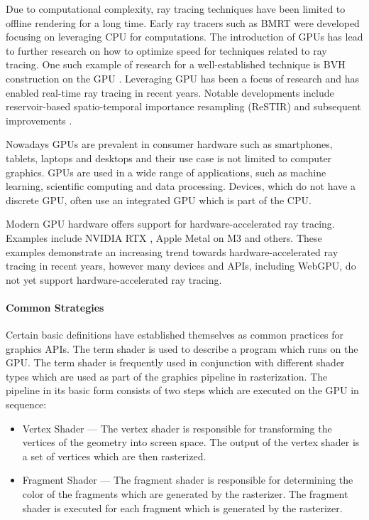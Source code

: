 Due to computational complexity, ray tracing techniques have been limited to offline rendering for a long time. Early ray tracers such as \gls{BMRT} were developed focusing on leveraging \gls{CPU} for computations. The introduction of \glspl{GPU} has lead to further research on how to optimize speed for techniques related to ray tracing. One such example of research for a well-established technique is \gls{BVH} construction on the \gls{GPU} \cite{lauterbach2009GPUbvh}. Leveraging \gls{GPU} has been a focus of research and has enabled real-time ray tracing in recent years. Notable developments include reservoir-based spatio-temporal importance resampling (ReSTIR) \cite{restir} and subsequent improvements \cite{restirAdvancements,restirGeneralized}.

Nowadays \glspl{GPU} are prevalent in consumer hardware such as smartphones, tablets, laptops and desktops and their use case is not limited to computer graphics. \glspl{GPU} are used in a wide range of applications, such as machine learning, scientific computing and data processing. Devices, which do not have a discrete \gls{GPU}, often use an integrated \gls{GPU} which is part of the \gls{CPU}.

Modern \gls{GPU} hardware offers support for hardware-accelerated ray tracing. Examples include NVIDIA RTX \cite{nvidiaRtxRayTracing}, Apple Metal on M3 \cite{appleM3GpuAdvancements} and others. These examples demonstrate an increasing trend towards hardware-accelerated ray tracing in recent years, however many devices and \glspl{API}, including \gls{WebGPU}, do not yet support hardware-accelerated ray tracing.

\paragraph{Common Strategies}
\label{sec:commonGpuStrategies}

Certain basic definitions have established themselves as common practices for graphics \glspl{API}. The term shader is used to describe a program which runs on the \gls{GPU}. The term shader is frequently used in conjunction with different shader types which are used as part of the graphics pipeline in rasterization. The pipeline in its basic form consists of two steps which are executed on the \gls{GPU} in sequence:

\begin{itemize}
    \item{Vertex Shader} — The vertex shader is responsible for transforming the vertices of the geometry into screen space. The output of the vertex shader is a set of vertices which are then rasterized.
    \item{Fragment Shader} — The fragment shader is responsible for determining the color of the fragments which are generated by the rasterizer. The fragment shader is executed for each fragment which is generated by the rasterizer.
\end{itemize}


